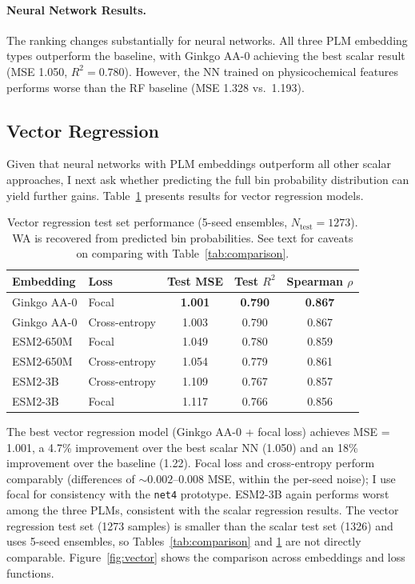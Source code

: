 \documentclass[12pt]{article}
\begin{document}
\paragraph{Neural Network Results.}
The ranking changes substantially for neural networks.
All three PLM embedding types outperform the baseline, with Ginkgo AA-0 achieving the best scalar result (MSE 1.050, $R^2 = 0.780$).
However, the NN trained on physicochemical features performs worse than the RF baseline (MSE 1.328 vs.\ 1.193).

\subsection{Vector Regression}
\label{sec:vector_results}

Given that neural networks with PLM embeddings outperform all other scalar approaches, I next ask whether predicting the full bin probability distribution can yield further gains.
Table~\ref{tab:vector} presents results for vector regression models.

\begin{table}[H]
\centering
\caption{Vector regression test set performance (5-seed ensembles, $N_{\text{test}} = 1273$). WA is recovered from predicted bin probabilities. See text for caveats on comparing with Table~\ref{tab:comparison}.}
\label{tab:vector}
\begin{tabular}{llccc}
\toprule
Embedding & Loss & Test MSE & Test $R^2$ & Spearman $\rho$ \\
\midrule
Ginkgo AA-0 & Focal & \textbf{1.001} & \textbf{0.790} & \textbf{0.867} \\
Ginkgo AA-0 & Cross-entropy & 1.003 & 0.790 & 0.867 \\
ESM2-650M & Focal & 1.049 & 0.780 & 0.859 \\
ESM2-650M & Cross-entropy & 1.054 & 0.779 & 0.861 \\
ESM2-3B & Cross-entropy & 1.109 & 0.767 & 0.857 \\
ESM2-3B & Focal & 1.117 & 0.766 & 0.856 \\
\bottomrule
\end{tabular}
\end{table}

The best vector regression model (Ginkgo AA-0 + focal loss) achieves MSE = 1.001, a 4.7\% improvement over the best scalar NN (1.050) and an 18\% improvement over the baseline (1.22).
Focal loss and cross-entropy perform comparably (differences of ${\sim}0.002$--$0.008$ MSE, within the per-seed noise); I use focal for consistency with the \texttt{net4} prototype.
ESM2-3B again performs worst among the three PLMs, consistent with the scalar regression results.
The vector regression test set (1273 samples) is smaller than the scalar test set (1326) and uses 5-seed ensembles, so Tables~\ref{tab:comparison} and \ref{tab:vector} are not directly comparable.
Figure~\ref{fig:vector} shows the comparison across embeddings and loss functions.
\end{document}
